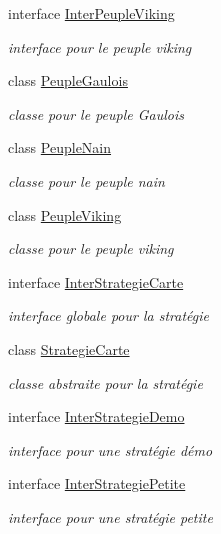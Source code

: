 \begin{DoxyCompactItemize}
interface \hyperlink{interface_small_world_1_1_inter_peuple_viking}{Inter\-Peuple\-Viking}
\begin{DoxyCompactList}\small\item\em interface pour le peuple viking \end{DoxyCompactList}\item 
class \hyperlink{class_small_world_1_1_peuple_gaulois}{Peuple\-Gaulois}
\begin{DoxyCompactList}\small\item\em classe pour le peuple Gaulois \end{DoxyCompactList}\item 
class \hyperlink{class_small_world_1_1_peuple_nain}{Peuple\-Nain}
\begin{DoxyCompactList}\small\item\em classe pour le peuple nain \end{DoxyCompactList}\item 
class \hyperlink{class_small_world_1_1_peuple_viking}{Peuple\-Viking}
\begin{DoxyCompactList}\small\item\em classe pour le peuple viking \end{DoxyCompactList}\item 
interface \hyperlink{interface_small_world_1_1_inter_strategie_carte}{Inter\-Strategie\-Carte}
\begin{DoxyCompactList}\small\item\em interface globale pour la stratégie \end{DoxyCompactList}\item 
class \hyperlink{class_small_world_1_1_strategie_carte}{Strategie\-Carte}
\begin{DoxyCompactList}\small\item\em classe abstraite pour la stratégie \end{DoxyCompactList}\item 
interface \hyperlink{interface_small_world_1_1_inter_strategie_demo}{Inter\-Strategie\-Demo}
\begin{DoxyCompactList}\small\item\em interface pour une stratégie démo \end{DoxyCompactList}\item 
interface \hyperlink{interface_small_world_1_1_inter_strategie_petite}{Inter\-Strategie\-Petite}
\begin{DoxyCompactList}\small\item\em interface pour une stratégie petite \end{DoxyCompactList}\item 

\end{DoxyCompactItemize}
